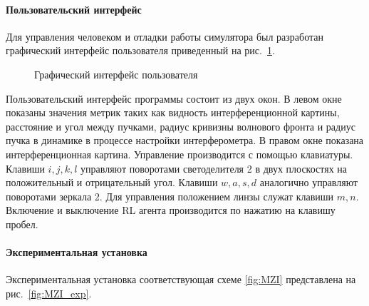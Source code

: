 \paragraph{Пользовательский интерфейс}

Для управления человеком и отладки работы симулятора был разработан графический интерфейс пользователя приведенный на рис.~\ref{fig:gui}. 

\begin{figure}[ht]
\caption{Графический интерфейс пользователя}
\label{fig:gui}
\end{figure}

Пользовательский интерфейс программы состоит из двух окон. В левом окне показаны значения метрик таких как видность интерференционной картины, расстояние и угол между пучками, радиус кривизны волнового фронта и радиус пучка в динамике в процессе настройки интерферометра. В правом окне показана интерференционная картина. Управление производится с помощью клавиатуры. Клавиши $i,j,k,l$ управляют поворотами светоделителя 2 в двух плоскостях на положительный и отрицательный угол. Клавиши $w,a,s,d$ аналогично управляют поворотами зеркала 2. Для управления положением линзы служат клавиши $m,n$. Включение и выключение RL агента производится по нажатию на клавишу пробел.

\paragraph{Экспериментальная установка}

Экспериментальная установка соответствующая схеме \ref{fig:MZI} представлена на рис.~\ref{fig:MZI_exp}. 

